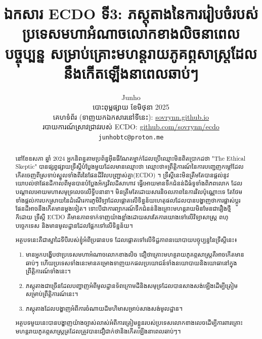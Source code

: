 \documentclass[10pt,twocolumn,letterpaper]{article}
\begin{document}
\title{ឯកសារ ECDO ទី3: ភស្តុតាងនៃការរៀបចំរបស់ប្រទេសមហាអំណាចលោកខាងលិចនាពេលបច្ចុប្បន្ន សម្រាប់គ្រោះមហន្តរាយភូគព្ភសាស្ត្រដែលនឹងកើតឡើងនាពេលឆាប់ៗ}

\author{Junho\\
	បោះពុម្ពផ្សាយ ខែមិថុនា 2025\\
	គេហទំព័រ (ទាញយកឯកសារនៅទីនេះ): \href{https://sovrynn.github.io}{sovrynn.github.io}\\
	របាយការណ៍ស្រាវជ្រាវរបស់ ECDO: \href{https://github.com/sovrynn/ecdo}{github.com/sovrynn/ecdo}\\
{\tt\small junhobtc@proton.me}
}
\maketitle

\begin{abstract}
	នៅខែឧសភា ឆ្នាំ 2024 អ្នកនិពន្ធតាមប្រព័ន្ធអ៊ីនធឺណែតម្នាក់ដែលប្រើឈ្មោះមិនពិតប្រាកដថា "The Ethical Skeptic" \cite{0} បានផ្សព្វផ្សាយទ្រឹស្ដីបំប្លែងមួយដែលមានឈ្មោះថា ឈ្មោះថា៖ព្រឹត្តិការណ៍នៃការបញ្ជេញកម្តៅដែលកើតចេញពីស្រទាប់ស្នូលទាំងពីរនៃផែនដីវិលបញ្ជ្រាស់គ្នា(ECDO) \cite{1}។ ទ្រឹស្ដីនេះមិនត្រឹមតែបានផ្តល់នូវយោបល់ថាផែនដីកាលពីមុនបានបំប្លែងអ័ក្សវិលដ៏សាហាវ ធ្វើអោយមានទឹកជំនន់ដ៏ធំទូទាំងពិភពលោក ដែលបណ្តាលអោយមហាសមុទ្រលេចលើទ្វីបនានា។ មិនត្រឹមតែដោយសារនិចលភាពនៃការវិលប៉ុណ្ណោះទេ តែថែមទាំងផ្ដល់ការបកស្រាយនៃដំណើរការភូមិវិទ្យាដែលផ្តោតលើទិន្នន័យហេតុផលដែលបានបង្ហាញថាការផ្លាស់ប្តូរផែនដីអាចនឹងកើតមានម្តងទៀត។ ទោះបីជាការព្យាករណ៍ទឹកជំនន់និងគ្រោះមហន្តរាយមិនមែនជារឿងថ្មីក៏ដោយ ទ្រឹស្ដី ECDO គឺមានភាពទាក់ទាញយ៉ាងខ្លាំងដោយសារតែការយោងទៅលើវិទ្យាសាស្ត្រ ពហុបច្ចេកទេស និងមានមូលដ្ឋានដែលផ្អែកទៅលើទិន្នន័យ។

	អត្ថបទនេះគឺជាស្នាដៃទីបីរបស់ខ្ញុំអំពីប្រធានបទ\cite{2,3}  ដែលផ្តោតទៅលើទិដ្ឋភាពនយោបាយបច្ចុប្បន្ននៃទ្រឹស្តីនេះ៖
\begin{flushleft}
\begin{enumerate}
    \item មានអ្នកបង្ហើបថាប្រទេសមហាអំណាចលោកខាងលិច ជឿថាគ្រោះមហន្ថរាយភូគព្ភសាស្ត្រគឺអាចកើតមានឆាប់ៗ ហើយប្រទេសទាំងនេះមានគម្រោងទាញយកផលប្រយោជន៍ទាំងនយោបាយនិងយោធានៅក្នុងព្រឹត្តិការណ៍ទាំងនេះ។
    \item ភស្តុតាងជាច្រើនដែលបញ្ហាញអំពីមូលដ្ឋានទ័ពក្រោមដីនិងសមុទ្រដែលបានសាងសង់ឡើងដើម្បីត្រៀមសម្រាប់ព្រឹត្តិការណ៍នេះ។
    \item ភស្តុតាងដែលបង្ហាញអំពីការចំណាយដ៏មហិមាសម្រាប់សាងសង់មូលដ្ឋាន។
\end{enumerate}
\end{flushleft}
	អត្ថបទមួយនេះបានបង្ហាញយ៉ាងច្បាស់លាស់អំពីការត្រៀមខ្លួនរបស់ប្រទេសលោកខាងលេចដើម្បីការពារគ្រោះមហន្តរាយភូគព្ភសាស្ត្រត្រដែលត្រូវបានជឿជាក់ថានិងកើតឡើងនាពេលឆាប់ៗ។
\end{abstract}
\end{document}
